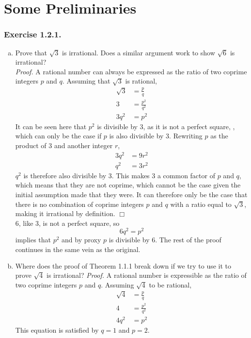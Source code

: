 \documentclass[../Exercises.tex]{subfiles}
\begin{document}
	\setcounter{section}{1}
	\section{Some Preliminaries}
		\subsubsection*{Exercise 1.2.1.}
			\begin{enumerate}[(a)]
				\item
					Prove that $\sqrt{3}$ is irrational. Does a similar argument work to show $\sqrt{6}$ is irrational? \\
					\emph{Proof.} 
						A rational number can always be expressed as the ratio of two coprime integers $p$ and $q$. Assuming that $\sqrt{3}$ is rational,
							\begin{align*}
								\sqrt{3} &= \frac{p}{q} \\
								3 &= \frac{p^2}{q^2} \\
								3q^2 &= p^2
							\end{align*}
						It can be seen here that $p^2$ is divisible by 3, as it is not a perfect square, , which can only be the case if $p$ is also divisible by 3. Rewriting $p$ as the product of 3 and another integer $r$, 
							\begin{align*}
								3q^2 &= 9r^2 \\
								q^2 &= 3r^2
							\end{align*}
						$q^2$ is therefore also divisible by 3. This makes 3 a common factor of $p$ and $q$, which means that they are not coprime, which cannot be the case given the initial assumption made that they were. It can therefore only be the case that there is no combination of coprime integers $p$ and $q$ with a ratio equal to $\sqrt{3}$, making it irrational by definition. $\Box$ \\
					6, like 3, is not a perfect square, so
						\[6q^2 = p^2\]
						implies that $p^2$ and by proxy $p$ is divisible by 6. The rest of the proof continues in the same vein as the original.
				\item
					Where does the proof of Theorem 1.1.1 break down if we try to use it to prove $\sqrt{4}$ is irrational?
					\emph{Proof.} 
						A rational number is expressible as the ratio of two coprime integers $p$ and $q$. Assuming $\sqrt{4}$ to be rational,
							\begin{align*}
								\sqrt{4} &= \frac{p}{q} \\
								4 &= \frac{p^2}{q^2} \\
								4q^2 &= p^2
							\end{align*}
						This equation is satisfied by $q = 1$ and $p = 2$.
			\end{enumerate}
\end{document}
